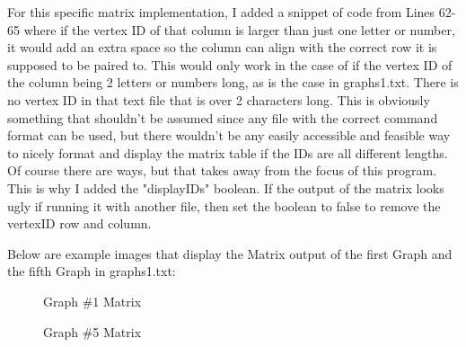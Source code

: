 \documentclass[letterpaper, 10pt]{article}
\begin{document}
\vspace{1em}

\noindent
For this specific matrix implementation, I added a snippet of code from Lines 62-65 where if the vertex ID of that column is larger than just one letter or number, it would add an extra space so the column can align with the correct row it is supposed to be paired to. This would only work in the case of if the vertex ID of the column being 2 letters or numbers long, as is the case in graphs1.txt. There is no vertex ID in that text file that is over 2 characters long. This is obviously something that shouldn't be assumed since any file with the correct command format can be used, but there wouldn't be any easily accessible and feasible way to nicely format and display the matrix table if the IDs are all different lengths. Of course there are ways, but that takes away from the focus of this program. This is why I added the "displayIDs" boolean. If the output of the matrix looks ugly if running it with another file, then set the boolean to false to remove the vertexID row and column.  

\vspace{2em}

\noindent
Below are example images that display the Matrix output of the first Graph and the fifth Graph in graphs1.txt:

\begin{figure}[H] 
    \centering 
    \caption{Graph \#1 Matrix}
    \label{fig:figure2.8}
\end{figure}

\begin{figure}[H] 
    \centering 
    \caption{Graph \#5 Matrix}
    \label{fig:figure2.9}
\end{figure}
\end{document}
